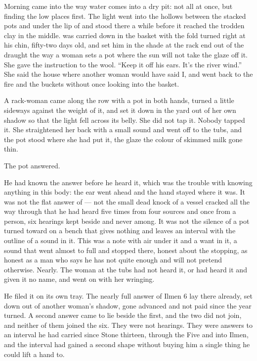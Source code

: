 
Morning came into  the way water comes into a dry pit: not all at once, but finding the low places first. The light went into the hollows between the stacked pots and under the lip of  and stood there a while before it reached the trodden clay in the middle.  was carried down in the basket with the fold turned right at his chin, fifty-two days old, and  set him in the shade at the rack end out of the draught the way a woman sets a pot where the sun will not take the glaze off it. She gave the instruction to the wool. “Keep it off his ears. It's the river wind.” She said the house where another woman would have said I, and went back to the fire and the buckets without once looking into the basket.

A rack-woman came along the row with a pot in both hands, turned a little sideways against the weight of it, and set it down in the yard out of her own shadow so that the light fell across its belly. She did not tap it. Nobody tapped it. She straightened her back with a small sound and went off to the tubs, and the pot stood where she had put it, the glaze the colour of skimmed milk gone thin.

The pot answered.

He had known the answer before he heard it, which was the trouble with knowing anything in this body: the ear went ahead and the hand stayed where it was. It was not the flat answer of  --- not the small dead knock of a vessel cracked all the way through that he had heard five times from four sources and once from a person, six hearings kept beside and never among. It was not the silence of a pot turned toward on a bench that gives nothing and leaves an interval with the outline of a sound in it. This was a note with air under it and a want in it, a sound that went almost to full and stopped there, honest about the stopping, as honest as a man who says he has not quite enough and will not pretend otherwise. Nearly. The woman at the tubs had not heard it, or had heard it and given it no name, and went on with her wringing.

He filed it on its own tray. The nearly full answer of Ilmen 6 lay there already, set down out of another woman's shadow, gone advanced and not paid since the year turned. A second answer came to lie beside the first, and the two did not join, and neither of them joined the six. They were not hearings. They were answers to an interval he had carried since Stone thirteen, through the Five and into Ilmen, and the interval had gained a second shape without buying him a single thing he could lift a hand to.

